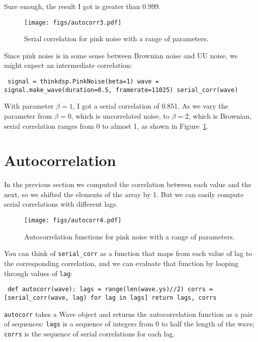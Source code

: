 \documentclass[12pt]{book} \usepackage[width=5.5in,height=8.5in, hmarginratio=3:2,vmarginratio=1:1]{geometry}
\begin{document}
Sure enough, the result I got is greater than 0.999. 

\begin{figure} 

\centerline{\texttt{[image: figs/autocorr3.pdf]}} \caption{Serial correlation for pink noise with a range of parameters.} \label{fig.autocorr3} \end{figure} 

Since pink noise is in some sense between Brownian noise and UU noise, we might expect an intermediate correlation: 

\begin{verbatim} signal = thinkdsp.PinkNoise(beta=1) wave = signal.make_wave(duration=0.5, framerate=11025) serial_corr(wave) \end{verbatim} 

With parameter $\beta=1$, I got a serial correlation of 0.851. As we vary the parameter from $\beta=0$, which is uncorrelated noise, to $\beta=2$, which is Brownian, serial correlation ranges from 0 to almost 1, as shown in Figure~\ref{fig.autocorr3}. 

\section{Autocorrelation} \label{autopink} 

In the previous section we computed the correlation between each value and the next, so we shifted the elements of the array by 1. But we can easily compute serial correlations with different lags. 

\begin{figure} 

\centerline{\texttt{[image: figs/autocorr4.pdf]}} \caption{Autocorrelation functions for pink noise with a range of parameters.} \label{fig.autocorr4} \end{figure} 

You can think of \verb"serial_corr" as a function that maps from each value of lag to the corresponding correlation, and we can evaluate that function by looping through values of {\tt lag}: 

\begin{verbatim} def autocorr(wave): lags = range(len(wave.ys)//2) corrs = [serial_corr(wave, lag) for lag in lags] return lags, corrs \end{verbatim} 

{\tt autocorr} takes a Wave object and returns the autocorrelation function as a pair of sequences: {\tt lags} is a sequence of integers from 0 to half the length of the wave; {\tt corrs} is the sequence of serial correlations for each lag. 
\end{document}
